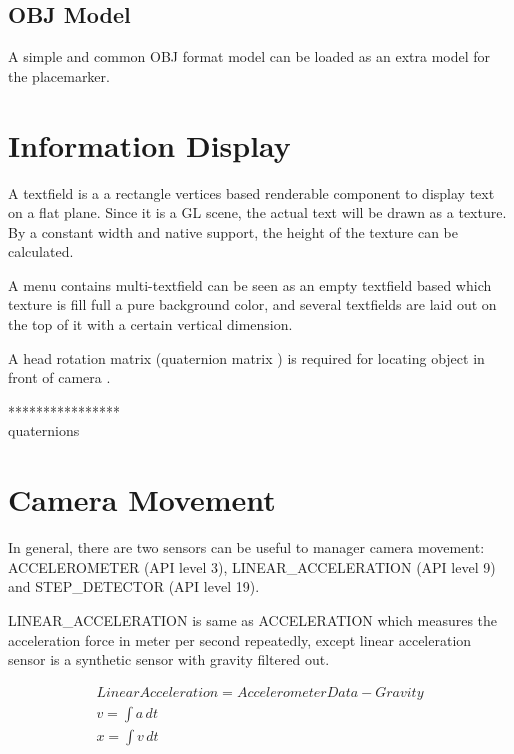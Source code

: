 \subsection{OBJ Model}

A simple and common OBJ format model can be loaded as an extra model for the placemarker.

\section{Information Display}

A textfield is a a rectangle vertices based renderable component to display text on a flat plane. Since it is a GL scene, the actual text will be drawn as a texture. By a constant width and native  support, the height of the texture can be calculated. 

A menu contains multi-textfield can be seen as an empty textfield based which texture is fill full a pure background color, and several  textfields are laid out on the top of it with a certain vertical dimension.

A head rotation matrix (quaternion matrix \parencite{jvv.quaternions.2013}) is required for locating object in front of camera \parencite{mathworks.quaternion-rotation.2016} .

****************\\
quaternions

\section{Camera Movement}

In general, there are two sensors can be useful to manager camera movement: ACCELEROMETER (API level 3), LINEAR\_ACCELERATION (API level 9) and STEP\_DETECTOR (API level 19). 

LINEAR\_ACCELERATION is same as ACCELERATION which measures the acceleration force in meter per second repeatedly, except linear acceleration sensor is a synthetic sensor with gravity filtered out. 

\[
\begin{array}{lr}
Linear Acceleration = Accelerometer Data - Gravity \\
v = \int a\,dt \\
x = \int v\,dt
\end{array}
\]

